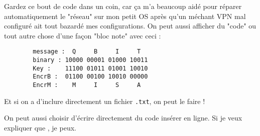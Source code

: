 Gardez ce bout de code dans un coin, car ça m'a beaucoup aidé pour réparer automatiquement le
"réseau" sur mon petit OS après qu'un méchant VPN mal configuré ait tout bazardé mes
configurations.
\ideaEnd
On peut aussi afficher du "code" ou tout autre chose d'une façon "bloc note" avec ceci :
\begin{mycodebox}
    \begin{verbatim}
        message :  Q     B     I     T
        binary : 10000 00001 01000 10011
        Key :    11100 01011 01001 10010
        EncrB :  01100 00100 10010 00000
        EncrM :    M     I     S     A
    \end{verbatim}
\end{mycodebox}

Et si on a  d'inclure directement un fichier \texttt{.txt}, on peut le faire !


On peut aussi choisir d'écrire directement du code insérer en ligne. Si je veux expliquer que
, je peux.

